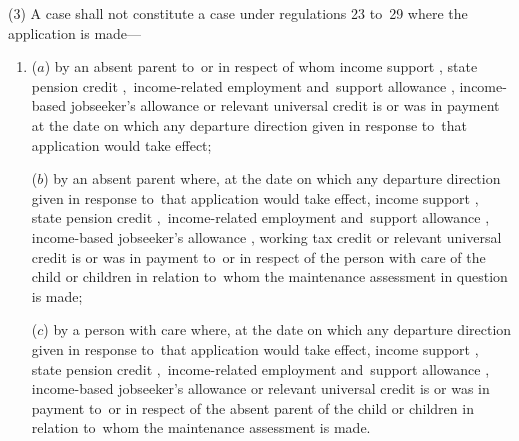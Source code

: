 \documentclass[12pt,a4paper]{article}
\begin{document}
(3) A case shall not constitute a case under regulations 23 to~29 where the application is made—
\begin{enumerate}\item[]
($a$) by an absent parent to~or in respect of whom income support%
, state pension credit%
,~income-related employment and~support allowance%
, income-based jobseeker’s allowance or relevant universal credit  %
is or was in payment at the date on which any departure direction given in response to~that application would take effect;

($b$) by an absent parent where, at the date on which any departure direction given in response to~that application would take effect, income support%
, state pension credit%
,~income-related employment and~support allowance%
, income-based jobseeker’s allowance%
, working tax credit or relevant universal credit  %
is or was in payment to~or in respect of the person with care of the child or children in relation to~whom the maintenance assessment in question is made;

($c$) by a person with care where, at the date on which any departure direction given in response to~that application would take effect, income support%
, state pension credit%
,~income-related employment and~support allowance%
, income-based jobseeker’s allowance or relevant universal credit  %
is or was in payment to~or in respect of the absent parent of the child or children in relation to~whom the maintenance assessment is made.
\end{enumerate}
\end{document}
